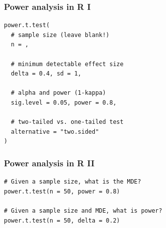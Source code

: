 \documentclass[14pt]{beamer} %
\begin{document}


\begin{frame}[fragile]

\frametitle{Power analysis in R I}
\small
\begin{verbatim}
power.t.test(
  # sample size (leave blank!)
  n = ,
  
  # minimum detectable effect size
  delta = 0.4, sd = 1,
  
  # alpha and power (1-kappa)
  sig.level = 0.05, power = 0.8,
  
  # two-tailed vs. one-tailed test
  alternative = "two.sided"
)
\end{verbatim}
\end{frame}

\begin{frame}[fragile]
\frametitle{Power analysis in R II}
\small
\begin{verbatim}
# Given a sample size, what is the MDE?
power.t.test(n = 50, power = 0.8)

# Given a sample size and MDE, what is power?
power.t.test(n = 50, delta = 0.2)

\end{verbatim}
\end{frame}
\end{document}
